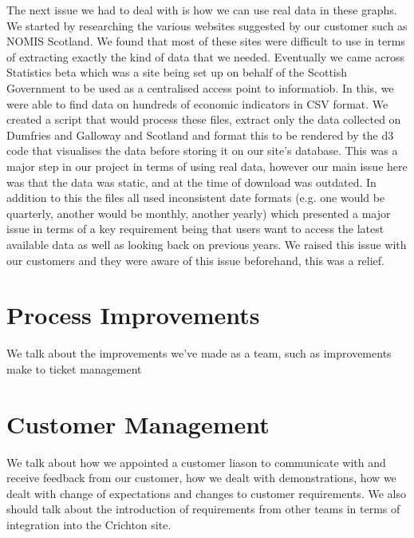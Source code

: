 \documentclass{l3proj}
\begin{document}
The next issue we had to deal with is how we can use real data in these graphs. We started by researching the various websites
suggested by our customer such as NOMIS Scotland. We found that most of these sites were difficult to use in terms of extracting
exactly the kind of data that we needed. Eventually we came across Statistics beta which was a site being set up on behalf of
the Scottish Government to be used as a centralised access point to informatiob. In this, we were able to find data on
hundreds of economic indicators in CSV format. We created a script that would process these files, extract only the data collected
on Dumfries and Galloway and Scotland and format this to be rendered by the d3 code that visualises the data before storing it on
our site's database. This was a major step in our project in terms of using real data, however our main issue here was that the
data was static, and at the time of download was outdated. In addition to this the files all used inconsistent date formats (e.g.
one would be quarterly, another would be monthly, another yearly) which presented a major issue in terms of a key requirement
being that users want to access the latest available data as well as looking back on previous years. We raised this issue
with our customers and they were aware of this issue beforehand, this was a relief.



\section{Process Improvements}
\label{managing}

We talk about the improvements we've made as a team, such as improvements make to ticket management


\section{Customer Management}
\label{sec:managing}

We talk about how we appointed a customer liason to communicate with and receive feedback from our customer, how we dealt with
demonstrations, how we dealt with change of expectations and changes to customer requirements. We also should talk about the
introduction of requirements from other teams in terms of integration into the Crichton site.
\end{document}
